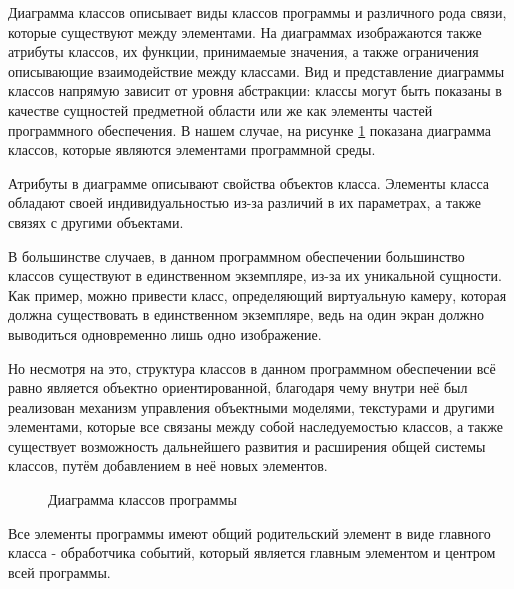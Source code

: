 Диаграмма классов описывает виды классов программы и различного рода связи, которые существуют между элементами. На диаграммах изображаются также атрибуты классов, их функции, принимаемые значения, а также ограничения описывающие взаимодействие между классами. Вид и представление диаграммы классов напрямую зависит от уровня абстракции: классы могут быть показаны в качестве сущностей предметной области или же как элементы частей программного обеспечения. В нашем случае, на рисунке \ref{diagram3:image} показана диаграмма классов, которые являются элементами программной среды. 

Атрибуты в диаграмме описывают свойства объектов класса. Элементы класса обладают своей индивидуальностью из-за различий в их параметрах, а также связях с другими объектами. 

В большинстве случаев, в данном программном обеспечении большинство классов существуют в единственном экземпляре, из-за их уникальной сущности. Как пример, можно привести класс, определяющий виртуальную камеру, которая должна существовать в единственном экземпляре, ведь на один экран должно выводиться одновременно лишь одно изображение.

Но несмотря на это, структура классов в данном программном обеспечении всё равно является объектно ориентированной, благодаря чему внутри неё был реализован механизм управления объектными моделями, текстурами и другими элементами, которые все связаны между собой наследуемостью классов, а также существует возможность дальнейшего развития и расширения общей системы классов, путём добавлением в неё новых элементов.

\begin{figure}[H]
\caption{Диаграмма классов программы}
\label{diagram3:image}
\end{figure}

Все элементы программы имеют общий родительский элемент в виде главного класса - обработчика событий, который является главным элементом и центром всей программы.

